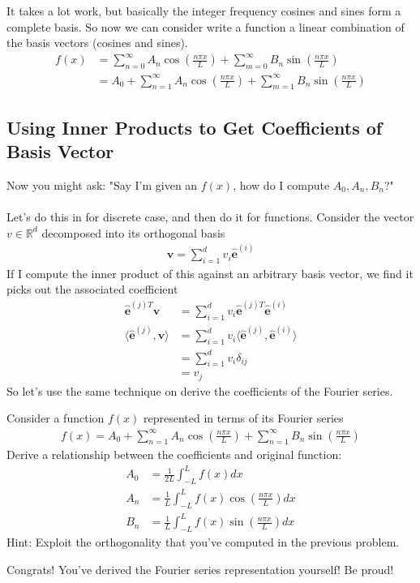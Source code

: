 \documentclass[12pt,fleqn]{article}
\numberwithin{equation}{section} %
\newcounter{problem}
\begin{document}
It takes a lot work, but basically the integer frequency cosines and sines form a complete basis. So now we can consider write a function a linear combination of the basis vectors (cosines and sines).
\begin{align}
	f(x) & = \sum_{n=0}^\infty A_n \cos\left(\frac{n \pi x}{L}\right) + \sum_{m=0}^\infty B_n \sin\left(\frac{n \pi x}{L}\right)\\
	& = A_0 + \sum_{n=1}^\infty A_n \cos\left(\frac{n \pi x}{L}\right) + \sum_{m=1}^\infty B_n \sin\left(\frac{n \pi x}{L}\right)
\end{align}

\subsection{Using Inner Products to Get Coefficients of Basis Vector}

Now you might ask: "Say I'm given an $f(x)$, how do I compute $A_0, A_n, B_n$?"
\\
\\
Let's do this in for discrete case, and then do it for functions. Consider the vector $v \in \mathbb R^d$ decomposed into its orthogonal basis
\begin{align} 
	\mathbf v = \sum_{i=1}^d v_i \mathbf{\hat e}^{(i)}
\end{align}
If I compute the inner product of this against an arbitrary basis vector, we find it picks out the associated coefficient
\begin{align}
	\mathbf{\hat e}^{(j) T}\mathbf v &= \sum_{i=1}^d v_i \mathbf{\hat e}^{(j) T} \mathbf{\hat e}^{(i)}\\
	\langle \mathbf{\hat e}^{(j)}, \mathbf v\rangle & = \sum_{i=1}^d v_i \langle \mathbf{\hat e}^{(j)},  \mathbf{\hat e}^{(i)} \rangle\\
	& =\sum_{i=1}^d v_i \delta_{ij}\\
	& = v_j
\end{align}
So let's use the same technique on derive the coefficients of the Fourier series. 
\begin{problem}
	Consider a function $f(x)$ represented in terms of its Fourier series
	\begin{align}
		f(x) = A_0 + \sum_{n=1}^\infty A_n \cos\left(\frac{n\pi x }{L}\right)  + \sum_{n=1}^\infty B_n \sin\left(\frac{n\pi x }{L}\right)
	\end{align}
	Derive a relationship between the coefficients and original function:
	\begin{align}
		A_0 & = \frac{1}{2L}\int_{-L}^L f(x) dx\\
		A_n & = \frac{1}{L}\int_{-L}^L f(x) \cos\left(\frac{n\pi x }{L}\right) dx\\
		B_n & = \frac{1}{L}\int_{-L}^L f(x) \sin\left(\frac{n\pi x }{L}\right) dx
	\end{align}
	Hint: Exploit the orthogonality that you've computed in the previous problem.
\end{problem}
Congrats! You've derived the Fourier series representation yourself! Be proud!
\end{document}
